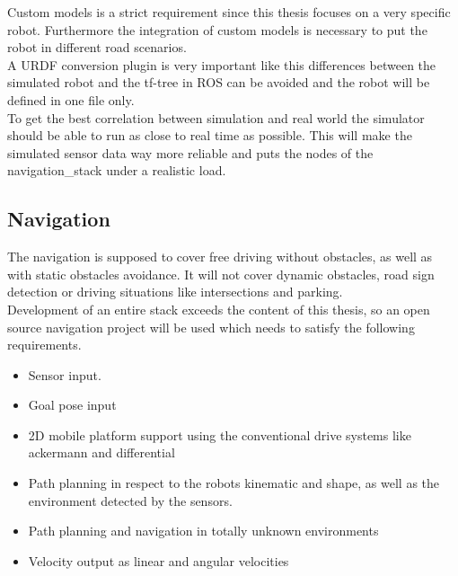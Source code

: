 Custom models is a strict requirement since this thesis focuses on a very specific robot. Furthermore the integration of custom models is necessary to put the robot in different road scenarios.\\

A URDF conversion plugin is very important like this differences between the simulated robot and the tf-tree in ROS can be avoided and the robot will be defined in one file only.\\

To get the best correlation between simulation and real world the simulator should be able to run as close to real time as possible. This will make the simulated sensor data way more reliable and puts the nodes of the navigation\_stack under a realistic load.

\subsection{Navigation}
The navigation is supposed to cover free driving without obstacles, as well as with static obstacles avoidance. It will not cover dynamic obstacles, road sign detection or driving situations like intersections and parking.\\

Development of an entire stack exceeds the content of this thesis, so an open source navigation project will be used which needs to satisfy the following requirements.
\begin{itemize}
	\item Sensor input.
	\item Goal pose input
	\item 2D mobile platform support using the conventional drive systems like ackermann and differential
	\item Path planning in respect to the robots kinematic and shape, as well as the environment detected by the sensors.
	\item Path planning and navigation in totally unknown environments
	\item Velocity output as linear and angular velocities
\end{itemize}
